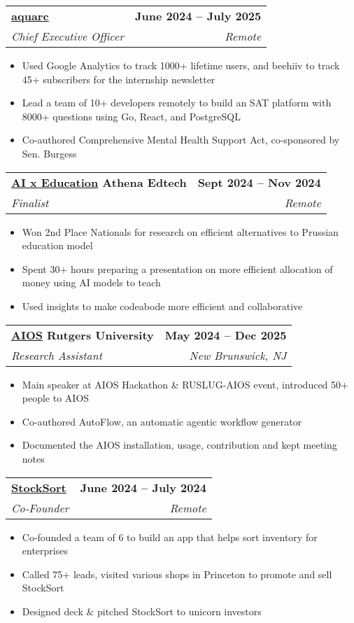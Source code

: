 \documentclass[letterpaper,11pt]{article}
\makeatletter
\newcommand{\resumeItem}[1]{
  \item\small{
    {#1 \vspace{-2pt}}
  }
}
\newcommand{\resumeSubheading}[4]{
  \vspace{-2pt}\item
   \begin{tabular*}{1.0\textwidth}[t]{l@{\extracolsep{\fill}}r}
      \textbf{#1} & \textbf{\small #2} \\
      \textit{\small#3} & \textit{\small #4} \\
    \end{tabular*}\vspace{-7pt}
}
\newcommand{\resumeItemListStart}{\begin{itemize}}
\newcommand{\resumeItemListEnd}{\end{itemize}\vspace{-5pt}}
\makeatother
\begin{document}
    \resumeSubheading
      {\href{https://aquarc.org}{\underline{aquarc}}}{June 2024 -- July 2025}
      {Chief Executive Officer}{Remote}
      \resumeItemListStart
        \resumeItem{Used Google Analytics to track 1000+ lifetime users, and beehiiv to track 45+ subscribers for the internship newsletter}
        \resumeItem{Lead a team of 10+ developers remotely to build an SAT platform with 8000+ questions using Go, React, and PostgreSQL}
        \resumeItem{Co-authored Comprehensive Mental Health Support Act, co-sponsored by Sen. Burgess}
    \resumeItemListEnd

   \resumeSubheading
     {\href{https://hbsp.harvard.edu/inspiring-minds/how-students-are-actually-using-generative-ai}{\underline{AI x Education}} Athena Edtech}{Sept 2024 -- Nov 2024}
     {Finalist}{Remote}
     \resumeItemListStart
     \resumeItem{Won 2nd Place Nationals for research on efficient alternatives to Prussian education model}
     \resumeItem{Spent 30+ hours preparing a presentation on more efficient allocation of money using AI models to teach}
     \resumeItem{Used insights to make codeabode more efficient and collaborative}
   \resumeItemListEnd

   \resumeSubheading
     {\href{https://github.com/agiresearch/AIOS}{\underline{AIOS}} Rutgers University}{May 2024 -- Dec 2025}
     {Research Assistant}{New Brunswick, NJ}
     \resumeItemListStart
     \resumeItem{Main speaker at AIOS Hackathon \& RUSLUG-AIOS event, introduced 50+ people to AIOS}
     \resumeItem{Co-authored AutoFlow, an automatic agentic workflow generator}
     \resumeItem{Documented the AIOS installation, usage, contribution and kept meeting notes}
   \resumeItemListEnd

    \resumeSubheading
      {\href{https://web.archive.org/web/20250119183417if_/https://stocksort.net/}{\underline{StockSort}}}{June 2024 -- July 2024}
      {Co-Founder}{Remote}
      \resumeItemListStart
        \resumeItem{Co-founded a team of 6 to build an app that helps sort inventory for enterprises}
        \resumeItem{Called 75+ leads, visited various shops in Princeton to promote and sell StockSort}
        \resumeItem{Designed deck \& pitched StockSort to unicorn investors}
      \resumeItemListEnd

    

\end{document}
